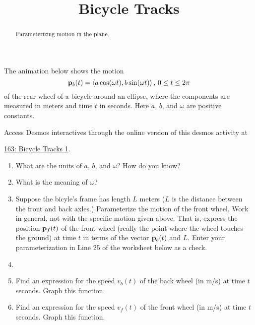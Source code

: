 \documentclass{ximera}
\title{Bicycle Tracks}
\begin{document}
\begin{abstract}
Parameterizing motion in the plane. 
\end{abstract}
\maketitle

\begin{exploration}

The animation below shows the motion
\[
   {\bf p}_b(t) = \langle a\cos (\omega t), b \sin (\omega t)  \rangle \, , \, 0\leq t \leq 2\pi 
\]
of the rear wheel of a bicycle around an ellipse, where the components are measured in meters and time $t$ in seconds.
Here $a$, $b$, and $\omega$ are positive constants.

\begin{onlineOnly}
    \begin{center}
\end{center}
\end{onlineOnly}

Access Desmos interactives through the online version of this desmos activity at
 
\href{https://www.desmos.com/calculator/cuo1lynesx}{163: Bicycle Tracks 1}.

\begin{enumerate}
\item What are the units of $a$, $b$, and $\omega$? How do you know?

\item  What is the meaning of $\omega$?

\item Suppose the bicyle's frame has length $L$ meters ($L$ is the distance between the front and back axles.) Parameterize the motion of the front wheel. Work in general, not with the specific motion given above. That is, express the position ${\bf p}_f(t)$
of the front wheel (really the point where the wheel touches the ground) at time $t$ in terms of the vector ${\bf p}_b(t)$ and $L$.
Enter your parameterization in Line 25 of the worksheet below as a check.

\item

\item Find an expression for the speed $v_b(t)$ of the back wheel (in m/s) at time $t$ seconds. Graph this function.

\item Find an expression for the speed $v_f(t)$ of the front wheel (in m/s) at time $t$ seconds. Graph this function.


\end{enumerate}
\end{exploration}
\end{document}
